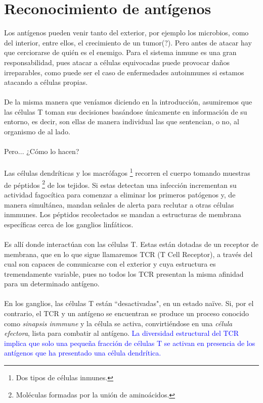 \documentclass{article}
\begin{document}
	 \section{Reconocimiento de antígenos}
	 Los antígenos pueden venir tanto del exterior, por ejemplo los microbios, como del interior, entre ellos, el crecimiento de un tumor(?). Pero antes de atacar hay que cerciorarse de quién es el enemigo. Para el sistema inmune es una gran responsabilidad, pues atacar a células equivocadas puede provocar daños irreparables, como puede ser el caso de enfermedades autoinmunes si estamos atacando a células propias.
	 \\
	 \\
	 De la misma manera que veníamos diciendo en la introducción, asumiremos que las células T toman sus decisiones basándose únicamente en información de su entorno, es decir, son ellas de manera individual las que sentencian, o no, al organismo de al lado.
	 \\
 	 \\
 	 Pero... ¿Cómo lo hacen?
 	 \\
 	 \\
 	 Las células dendríticas y los macrófagos \footnote{Dos tipos de células inmunes.} recorren el cuerpo tomando muestras de péptidos \footnote{Moléculas formadas por la unión de aminoácidos.} de los tejidos. Si estas detectan una infección incrementan su actividad fagocítica para comenzar a eliminar los primeros patógenos y, de manera simultánea, mandan señales de alerta para reclutar a otras células inmmunes. Los péptidos recolectados se mandan a estructuras de membrana específicas cerca de los ganglios linfáticos.
 	 \\
 	 \\
 	 Es allí donde interactúan con las células T. Estas están dotadas de un receptor de membrana, que en lo que sigue llamaremos TCR (T Cell Receptor), a través del cual son capaces de comunicarse con el exterior y cuya estructura es tremendamente variable, pues no todos los TCR presentan la misma afinidad para un determinado antígeno.
 	 \\
 	 \\
 	 En los ganglios, las células T están ``desactivadas", en un estado naïve. Si, por el contrario, el TCR y un antígeno se encuentran se produce un proceso conocido como \textit{sinapsis inmmune} y la célula se activa, convirtiéndose en una \textit{célula efectora}, lista para combatir al antígeno.
 	 \textcolor{blue}{La diversidad estructural del TCR implica que solo una pequeña fracción de células T se activan en presencia de los antígenos que ha presentado una célula dendrítica.}
\end{document}
